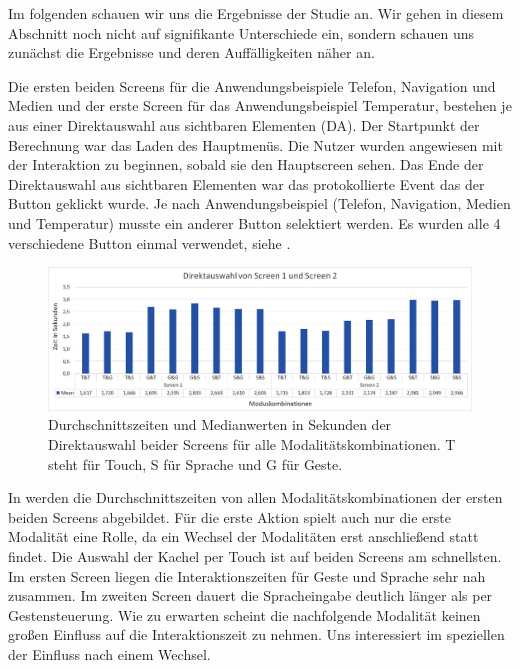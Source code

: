 Im folgenden schauen wir uns die Ergebnisse der Studie an. 
Wir gehen in diesem Abschnitt noch nicht auf signifikante Unterschiede ein, sondern schauen uns zunächst die Ergebnisse und deren Auffälligkeiten näher an. 

Die ersten beiden Screens für die Anwendungsbeispiele Telefon, Navigation und Medien und der erste Screen für das Anwendungsbeispiel Temperatur, bestehen je aus einer Direktauswahl aus sichtbaren Elementen (DA). 
Der Startpunkt der Berechnung war das Laden des Hauptmenüs. 
Die Nutzer wurden angewiesen mit der Interaktion zu beginnen, sobald sie den Hauptscreen sehen. 
Das Ende der Direktauswahl aus sichtbaren Elementen war das protokollierte Event das der Button geklickt wurde. 
Je nach Anwendungsbeispiel (Telefon, Navigation, Medien und Temperatur) musste ein anderer Button selektiert werden. 
Es wurden alle 4 verschiedene Button einmal verwendet, siehe .

\begin{figure}[ht]
  \centering
  \includegraphics[width=1\textwidth]{img/DA_Screen12.JPG}
  \caption[Durchschnittszeiten in Sekunden der Direktauswahl]{Durchschnittszeiten und Medianwerten in Sekunden der Direktauswahl beider Screens für alle Modalitätskombinationen. T steht für Touch, S für Sprache und G für Geste.}
  \label{fig:DA_Screen12}
\end{figure}

In  werden die Durchschnittszeiten von allen Modalitätskombinationen der ersten beiden Screens abgebildet. 
Für die erste Aktion spielt auch nur die erste Modalität eine Rolle, da ein Wechsel der Modalitäten erst anschließend statt findet. 
Die Auswahl der Kachel per Touch ist auf beiden Screens am schnellsten. 
Im ersten Screen liegen die Interaktionszeiten für Geste und Sprache sehr nah zusammen. 
Im zweiten Screen dauert die Spracheingabe deutlich länger als per Gestensteuerung.
Wie zu erwarten scheint die nachfolgende Modalität keinen großen Einfluss auf die Interaktionszeit zu nehmen. 
Uns interessiert im speziellen der Einfluss nach einem Wechsel. 

